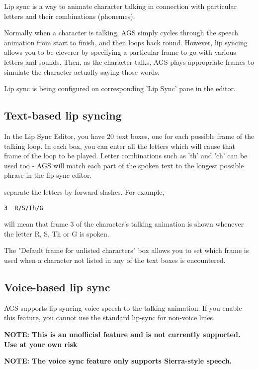Lip sync is a way to animate character talking in connection with particular letters and their combinations (phonemes).

Normally when a character is talking, AGS simply cycles through the speech animation
from start to finish, and then loops back round. However, lip syncing allows you to be
cleverer by specifying a particular frame to go with various letters and sounds. Then,
as the character talks, AGS plays appropriate frames to simulate the character actually
saying those words.

Lip sync is being configured on corresponding 'Lip Sync' pane in the editor.

\subsection{Text-based lip syncing}%

In the Lip Sync Editor, you have 20 text boxes, one for each possible frame of the
talking loop. In each box, you can enter all the letters which will cause that frame of
the loop to be played. Letter combinations such as 'th' and 'ch' can be used too - AGS
will match each part of the spoken text to the longest possible phrase in the lip sync
editor.

separate the letters by forward slashes. For example,

\begin{verbatim}
3  R/S/Th/G
\end{verbatim}

will mean that frame 3 of the character's talking animation is shown whenever the
letter R, S, Th or G is spoken.

The "Default frame for unlisted characters" box allows you to set which frame is used
when a character not listed in any of the text boxes is encountered.

\subsection{Voice-based lip sync}%

AGS supports lip syncing voice speech to the talking animation. If you enable this
feature, you cannot use the standard lip-sync for non-voice lines.

\bf{NOTE: This is an unofficial feature and is not currently supported. Use at
your own risk}

\bf{NOTE:} The voice sync feature only supports Sierra-style speech.

